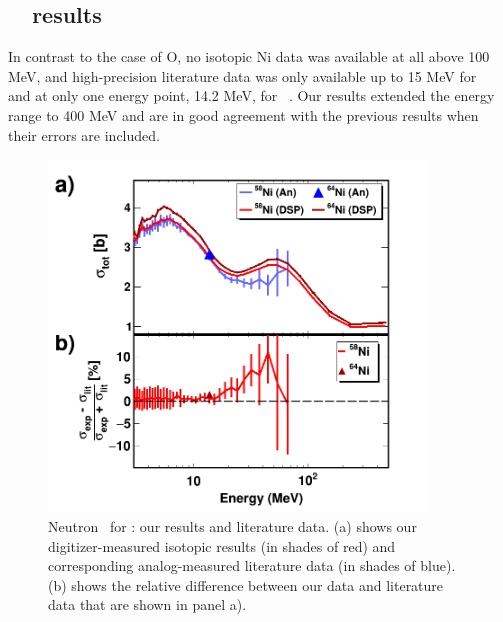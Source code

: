\subsection{\niEightFour\ \tot\ results}
In contrast to the case of O, no isotopic Ni data was available at all above 100
MeV, and high-precision literature data was only available up to 15 MeV for
\niEight\ \cite{Perey1993} and at only one energy point, 14.2 MeV, for \niFour\
\cite{Dukarevich1967}. Our results extended the energy range to 400 MeV and are
in good agreement with the previous results when their errors are included.
\begin{figure}[ht!]
    \centering
    \includegraphics[width=0.9\textwidth]{figures/TwoPanelNi.png}
    \caption[Neutron \tot\ for \niEightFour: our results and literature data]
    {
        Neutron \tot\ for \niEightFour: our results and literature data.
        (a) shows our digitizer-measured isotopic results (in shades of red) and
        corresponding analog-measured literature data \cite{Perey1993,
        Dukarevich1967} (in shades of blue). (b) shows the relative difference
        between our data and literature data that are shown in panel a).
    }
    \label{TwoPanelNi}
\end{figure}
